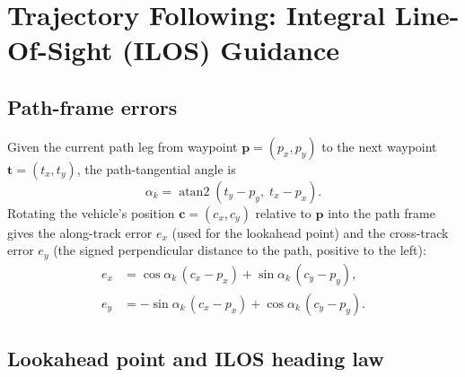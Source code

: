\section{Trajectory Following: Integral Line-Of-Sight (ILOS) Guidance}
\label{sec:ilos}

\begin{center}
\end{center}

\subsection{Path-frame errors}

Given the current path leg from waypoint $\mathbf{p}=(p_x,p_y)$ to the next waypoint $\mathbf{t}=(t_x,t_y)$, the path-tangential angle is
\begin{equation}
\alpha_k = \operatorname{atan2}(t_y - p_y,\; t_x - p_x).
\end{equation}
Rotating the vehicle's position $\mathbf{c}=(c_x,c_y)$ relative to $\mathbf{p}$ into the path frame gives the along-track error $e_x$ (used for the lookahead point) and the cross-track error $e_y$ (the signed perpendicular distance to the path, positive to the left):
\begin{align}
e_x &= \cos\alpha_k\,(c_x-p_x) + \sin\alpha_k\,(c_y-p_y), \\
e_y &= -\sin\alpha_k\,(c_x-p_x) + \cos\alpha_k\,(c_y-p_y).
\end{align}

\subsection{Lookahead point and ILOS heading law}

